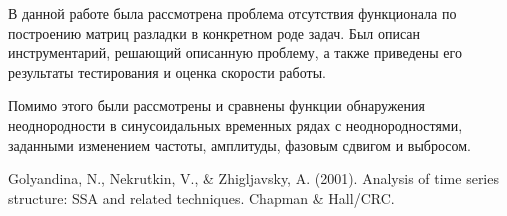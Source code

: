 \documentclass[specialist, substylefile = spbu.rtx,
			   subf, href, 12pt]{disser}
\begin{document}
В данной работе была рассмотрена проблема отсутствия функционала по построению матриц разладки в конкретном роде задач. Был описан инструментарий, решающий описанную проблему, а также приведены его результаты тестирования и оценка скорости работы. 

Помимо этого были рассмотрены и сравнены функции обнаружения неоднородности в синусоидальных временных рядах с неоднородностями, заданными изменением частоты, амплитуды, фазовым сдвигом и выбросом.




\begin{thebibliography}{3}
	Golyandina, N., Nekrutkin, V., \& Zhigljavsky, A. (2001). Analysis of time series structure: SSA and related techniques. Chapman \& Hall/CRC.
\end{thebibliography}

	
\end{document}
